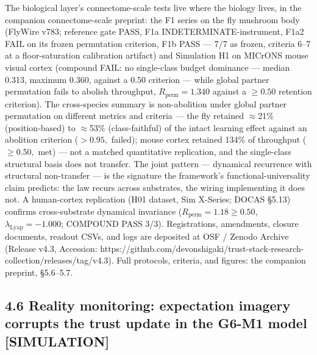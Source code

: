 \documentclass[
]{article}
\begin{document}
The biological layer's connectome-scale tests live where the biology
lives, in the companion connectome-scale preprint: the F1 series on the
fly mushroom body (FlyWire v783; reference gate PASS, F1a
INDETERMINATE-instrument, F1a2 FAIL on its frozen permutation criterion,
F1b PASS --- 7/7 as frozen, criteria 6--7 at a floor-saturation
calibration artifact) and Simulation H1 on MICrONS mouse visual cortex
(compound FAIL: no single-class budget dominance --- median 0.313,
maximum 0.360, against a 0.50 criterion --- while global partner
permutation fails to abolish throughput, \(R_{\mathrm{perm}} = 1.340\)
against a \(\geq 0.50\) retention criterion). The cross-species summary
is non-abolition under global partner permutation on different metrics
and criteria --- the fly retained \(\approx\)21\% (position-based) to
\(\approx\)53\% (class-faithful) of the intact learning effect against
an abolition criterion (\(>0.95,\) failed); mouse cortex retained 134\%
of throughput (\(\geq 0.50,\) met) --- not a matched quantitative
replication, and the single-class structural basis does not transfer.
The joint pattern --- dynamical recurrence with structural non-transfer
--- is the signature the framework's functional-universality claim
predicts: the law recurs across substrates, the wiring implementing it
does not. A human-cortex replication (H01 dataset, Sim X-Series; DOCAS
§5.13) confirms cross-substrate dynamical invariance
(\(R_{\mathrm{perm}} = 1.18 \ge 0.50\),
\(\lambda_{\mathrm{Lyap}} = -1.000\); COMPOUND PASS 3/3). Registrations,
amendments, closure documents, readout CSVs, and logs are deposited at
OSF / Zenodo Archive (Release v4.3, Accession:
https://github.com/devonshigaki/trust-stack-research-collection/releases/tag/v4.3).
Full protocols, criteria, and figures: the companion preprint,
§5.6--5.7.

\subsection{4.6 Reality monitoring: expectation imagery corrupts the
trust update in the G6-M1 model
{[}SIMULATION{]}}\label{reality-monitoring-expectation-imagery-corrupts-the-trust-update-in-the-g6-m1-model-simulation}
\end{document}
